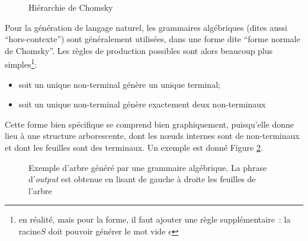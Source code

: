 \documentclass{article}
\begin{document}
				\begin{figure}
					\centering
						\caption{Hiérarchie de Chomsky}
						\label{fig:chomsky_hierarchy}
					\end{figure}
					Pour la génération de langage naturel, les grammaires algébriques (dites aussi ``hors-contexte'') sont généralement utilisées, dans une forme dite ``forme normale de Chomsky''. Les règles de production possibles sont alors beaucoup plus simples\footnote{en réalité, mais pour la forme, il faut ajouter une règle supplémentaire~: la racine$S$ doit pouvoir générer le mot vide $\epsilon$}:
				\begin{itemize}
					\item soit un unique non-terminal génère un unique terminal;
					\item soit un unique non-terminal génère exactement deux non-terminaux
				\end{itemize}
				Cette forme bien spécifique se comprend bien graphiquement, puisqu'elle donne lieu à une structure arborescente, dont les nœuds internes sont de non-terminaux et dont les feuilles sont des terminaux. Un exemple est donné Figure \ref{fig:ex_syntactic_tree}.
				\begin{figure}
					\centering
					\caption[]{Exemple d'arbre généré par une grammaire algébrique. La phrase d'\textit{output} est obtenue en lisant de gauche à droite les feuilles de l'arbre\footnotemark}
					\label{fig:ex_syntactic_tree}
				\end{figure}
\end{document}
